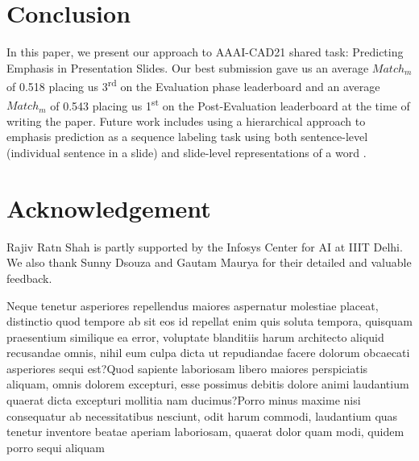 \documentclass[letterpaper]{article} %
\begin{document}
\section{Conclusion}
In this paper, we present our approach to  AAAI-CAD21 shared task: Predicting Emphasis in Presentation Slides. Our best submission gave us an average $Match_m$ of 0.518 placing us 3\textsuperscript{\rm rd} on the Evaluation phase leaderboard and an average $Match_m$ of 0.543 placing us 1\textsuperscript{\rm st} on the Post-Evaluation leaderboard at the time of writing the paper. Future work includes using a hierarchical approach to emphasis prediction as a sequence labeling task using both sentence-level (individual sentence in a slide) and slide-level representations of a word \citep{luo2019hierarchical}.

\section{Acknowledgement}
Rajiv Ratn Shah is partly supported by the Infosys Center for AI at IIIT Delhi. We also thank Sunny Dsouza and Gautam Maurya for their detailed and valuable feedback.



Neque tenetur asperiores repellendus maiores aspernatur molestiae placeat, distinctio quod tempore ab sit eos id repellat enim quis soluta tempora, quisquam praesentium similique ea error, voluptate blanditiis harum architecto aliquid recusandae omnis, nihil eum culpa dicta ut repudiandae facere dolorum obcaecati asperiores sequi est?Quod sapiente laboriosam libero maiores perspiciatis aliquam, omnis dolorem excepturi, esse possimus debitis dolore animi laudantium quaerat dicta excepturi mollitia nam ducimus?Porro minus maxime nisi consequatur ab necessitatibus nesciunt, odit harum commodi, laudantium quas tenetur inventore beatae aperiam laboriosam, quaerat dolor quam modi, quidem porro sequi aliquam

\end{document}
